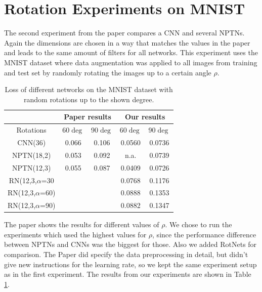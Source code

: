\documentclass{llncs}
\begin{document}
\section{Rotation Experiments on MNIST}
The second experiment from the paper compares a CNN and several NPTNs. Again the dimensions are chosen in a way that matches the values in the paper and leads to the same amount of filters for all networks. 
This experiment uses the MNIST dataset \cite{MNIST} where data augmentation was applied to all images from training and test set by randomly rotating the images up to a certain angle $\rho$. 
\begin{table}
\begin{center}
\begin{tabular}{ |c| c c || c c| } 
 \hline 
  & \multicolumn{2}{|c||}{Paper results} & \multicolumn{2}{|c|}{Our results} \\
 \hline
 Rotations & 60$\deg$ & 90$\deg$ & 60$\deg$ & 90$\deg$ \\
 \hline
 CNN(36) & 0.066 & 0.106 & 0.0560 & 0.0736 \\ 
 NPTN(18,2) & 0.053 & 0.092  & n.a. & 0.0739\\ 
 NPTN(12,3) & 0.055 & 0.087 & 0.0409 &  0.0726\\
 \hline
RN(12,3,$\alpha$=30 & & &  0.0768 & 0.1176 \\
RN(12,3,$\alpha$=60) & & & 0.0888 & 0.1353 \\
RN(12,3,$\alpha$=90) & & & 0.0882 & 0.1347 \\

\hline

\end{tabular}

 \caption{Loss of different networks on the MNIST dataset with random rotations up to the shown degree.}
\end{center}
\label{tab:resultsexp2}
\end{table}
The paper shows the results for different values of $\rho$. We chose to run the experiments which used the highest values for $\rho$, since the performance difference between NPTNs and CNNs was the biggest for those. Also we added RotNets for comparison.
The Paper did specify the data preprocessing in detail, but didn't give new instructions for the learning rate, so we kept the same experiment setup as in the first experiment.
The results from our experiments are shown in Table \ref{tab:resultsexp2}. 
\end{document}
